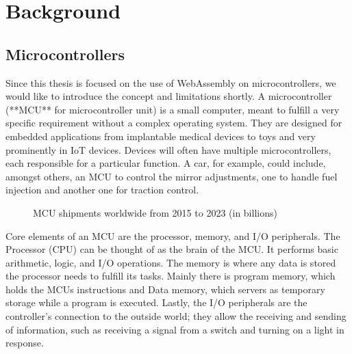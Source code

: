 
\chapter{Background}\label{chapter:background}

\section{Microcontrollers}
Since this thesis is focused on the use of WebAssembly on microcontrollers, we would like to introduce the concept and limitations shortly. A microcontroller (**MCU** for microcontroller unit) is a small computer, meant to fulfill a very specific requirement without a complex operating system. They are designed for embedded applications from implantable medical devices to toys and very prominently in IoT devices. Devices will often have multiple microcontrollers, each responsible for a particular function. A car, for example, could include, amongst others, an MCU to control the mirror adjustments, one to handle fuel injection and another one for traction control.

\begin{figure}
    \caption{MCU shipments worldwide from 2015 to 2023 (in billions)}
\end{figure}

Core elements of an MCU are the processor, memory, and I/O peripherals. The Processor (CPU) can be thought of as the brain of the MCU. It performs basic arithmetic, logic, and I/O operations. The memory is where any data is stored the processor needs to fulfill its tasks. Mainly there is program memory, which holds the MCUs instructions and Data memory, which servers as temporary storage while a program is executed. Lastly, the I/O peripherals are the controller's connection to the outside world; they allow the receiving and sending of information, such as receiving a signal from a switch and turning on a light in response.

